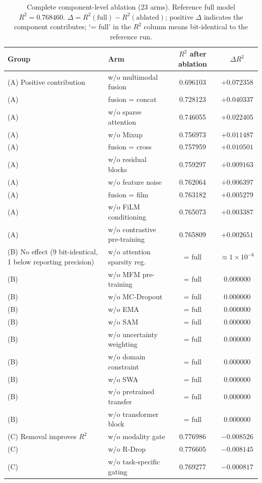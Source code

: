 \documentclass[utf8]{frontiers_suppmat}
\begin{document}
\begin{table}[h]
\centering
\caption{Complete component-level ablation (23 arms). Reference full model $R^2 = 0.768460$. $\Delta = R^2(\text{full}) - R^2(\text{ablated})$; positive $\Delta$ indicates the component contributes; `= full' in the $R^2$ column means bit-identical to the reference run.}
\label{tab:S9}
\begin{tabular}{llcc}
\toprule
Group & Arm & $R^2$ after ablation & $\Delta R^2$ \\
\midrule
(A) Positive contribution & w/o multimodal fusion & 0.696103 & $+0.072358$ \\
(A) & fusion = concat & 0.728123 & $+0.040337$ \\
(A) & w/o sparse attention & 0.746055 & $+0.022405$ \\
(A) & w/o Mixup & 0.756973 & $+0.011487$ \\
(A) & fusion = cross & 0.757959 & $+0.010501$ \\
(A) & w/o residual blocks & 0.759297 & $+0.009163$ \\
(A) & w/o feature noise & 0.762064 & $+0.006397$ \\
(A) & fusion = film & 0.763182 & $+0.005279$ \\
(A) & w/o FiLM conditioning & 0.765073 & $+0.003387$ \\
(A) & w/o contrastive pre-training & 0.765809 & $+0.002651$ \\
\midrule
(B) No effect (9 bit-identical, 1 below reporting precision) & w/o attention sparsity reg. & = full & $\approx 1 \times 10^{-6}$ \\
(B) & w/o MFM pre-training & = full & 0.000000 \\
(B) & w/o MC-Dropout & = full & 0.000000 \\
(B) & w/o EMA & = full & 0.000000 \\
(B) & w/o SAM & = full & 0.000000 \\
(B) & w/o uncertainty weighting & = full & 0.000000 \\
(B) & w/o domain constraint & = full & 0.000000 \\
(B) & w/o SWA & = full & 0.000000 \\
(B) & w/o pretrained transfer & = full & 0.000000 \\
(B) & w/o transformer block & = full & 0.000000 \\
\midrule
(C) Removal improves $R^2$ & w/o modality gate & 0.776986 & $-0.008526$ \\
(C) & w/o R-Drop & 0.776605 & $-0.008145$ \\
(C) & w/o task-specific gating & 0.769277 & $-0.000817$ \\
\bottomrule
\end{tabular}
\end{table}
\end{document}
